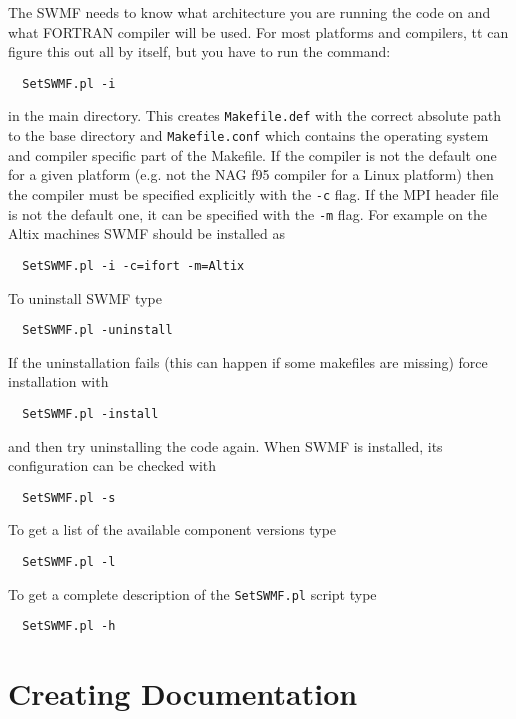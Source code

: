 The SWMF needs to know what architecture you are running the code on
and what FORTRAN compiler will be used.  For most platforms and compilers,
tt can figure this out all by itself, but you have to run the command:
\begin{verbatim}
  SetSWMF.pl -i
\end{verbatim}
in the main directory. This creates {\tt Makefile.def} with
the correct absolute path to the base directory and {\tt Makefile.conf}
which contains the operating system and compiler specific part of
the Makefile. If the compiler is not the default one for a given
platform (e.g. not the NAG f95 compiler for a Linux platform) then
the compiler must be specified explicitly with the {\tt -c}
flag. If the MPI header file is not the default one, it can be
specified with the {\tt -m} flag. For example on the Altix machines
SWMF should be installed as
\begin{verbatim}
  SetSWMF.pl -i -c=ifort -m=Altix
\end{verbatim}
To uninstall SWMF type
\begin{verbatim}
  SetSWMF.pl -uninstall
\end{verbatim}
If the uninstallation fails (this can happen if some makefiles are missing)
force installation with
\begin{verbatim}
  SetSWMF.pl -install
\end{verbatim}
and then try uninstalling the code again.
When SWMF is installed, its configuration can be checked with
\begin{verbatim}
  SetSWMF.pl -s
\end{verbatim}
To get a list of the available component versions type
\begin{verbatim}
  SetSWMF.pl -l
\end{verbatim}
To get a complete description of the {\tt SetSWMF.pl}  script type
\begin{verbatim}
  SetSWMF.pl -h
\end{verbatim}

\section{Creating Documentation}

